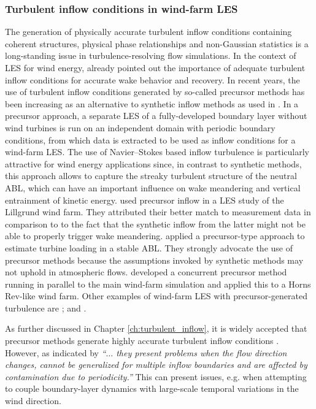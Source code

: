 \subsubsection{Turbulent inflow conditions in wind-farm LES}
The generation of physically accurate turbulent inflow conditions containing coherent structures, physical phase relationships and non-Gaussian statistics is a long-standing issue in turbulence-resolving flow simulations. In the context of LES for wind energy, \cite{troldborg2007actuator} already pointed out the importance of adequate turbulent inflow conditions for accurate wake behavior and recovery. In recent years, the use of turbulent inflow conditions generated by so-called precursor methods has been increasing \citep{keating2004priori, tabor2010inlet} as an alternative to synthetic inflow methods as used in \cite{ivanell2009numerical}. In a precursor approach, a separate LES of a fully-developed boundary layer without wind turbines is run on an independent domain with periodic boundary conditions, from which data is extracted to be used as inflow conditions for a wind-farm LES. The use of Navier--Stokes based inflow turbulence is particularly attractive for wind energy applications since, in contrast to synthetic methods, this approach allows to capture the streaky turbulent structure of the neutral ABL, which can have an important influence on wake meandering and vertical entrainment of kinetic energy. \cite{churchfield2012large} used precursor inflow in a LES study of the Lillgrund wind farm. They attributed their better match to measurement data in comparison to \cite{ivanell2009numerical} to the fact that the synthetic inflow from the latter might not be able to properly trigger wake meandering. 
\cite{park2014large} applied a precursor-type approach to estimate turbine loading in a stable ABL. They strongly advocate the use of precursor methods because the assumptions invoked by synthetic methods may not uphold in atmospheric flows. \cite{stevens2014concurrent} developed a concurrent precursor method running in parallel to the main wind-farm simulation and applied this to a Horns Rev-like wind farm. Other examples of wind-farm LES with precursor-generated turbulence are \cite{porte2011large,archer2013quantifying,wu2013simulation,stevens2014large,abkar2016wake}; and \cite{stevens2016dependence}.

\pagebreak

As further discussed in Chapter \ref{ch:turbulent_inflow}, it is widely accepted that precursor methods generate highly accurate turbulent inflow conditions \citep{keating2004priori,tabor2010inlet,wu2017inflow}. However, as indicated by \cite{esparza2014bridging} \emph{``$\dots$ they present problems when the flow direction changes, cannot be generalized for multiple inflow boundaries and are affected by contamination due to periodicity.''} This can present issues, e.g. when attempting to couple boundary-layer dynamics with large-scale temporal variations in the wind direction. 


